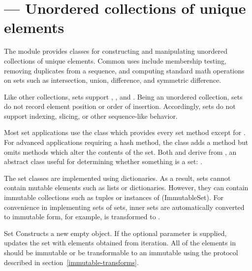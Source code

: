 \section{ ---
         Unordered collections of unique elements}



The  module provides classes for constructing and manipulating
unordered collections of unique elements.  Common uses include membership
testing, removing duplicates from a sequence, and computing standard math
operations on sets such as intersection, union, difference, and symmetric
difference.

Like other collections, sets support ,
, and .  Being an
unordered collection, sets do not record element position or order of
insertion.  Accordingly, sets do not support indexing, slicing, or
other sequence-like behavior.

Most set applications use the  class which provides every set
method except for . For advanced applications requiring
a hash method, the  class adds a 
method but omits methods which alter the contents of the set. Both
 and  derive from , an
abstract class useful for determining whether something is a set:
.

The set classes are implemented using dictionaries.  As a result, sets
cannot contain mutable elements such as lists or dictionaries.
However, they can contain immutable collections such as tuples or
instances of \class(ImmutableSet).  For convenience in implementing
sets of sets, inner sets are automatically converted to immutable
form, for example,  is transformed to
.

\begin{classdesc}{Set}{}
Constructs a new empty  object.  If the optional 
parameter is supplied, updates the set with elements obtained from iteration.
All of the elements in  should be immutable or be transformable
to an immutable using the protocol described in
section~\ref{immutable-transforms}.
\end{classdesc}

